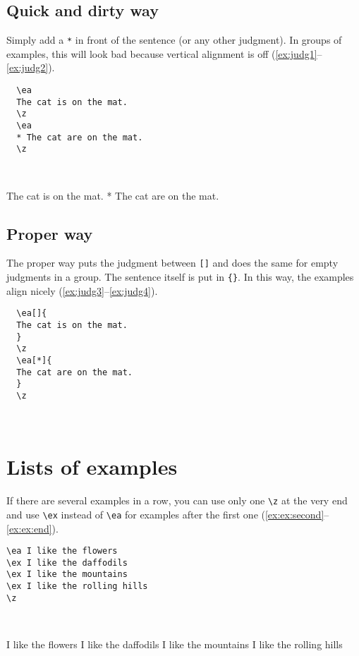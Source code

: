 \documentclass[output=paper]{langscibook}
\newcommand{\cmd}[1]{\texttt{\textbackslash#1}}
\begin{document}
\subsection{Quick and dirty way}  
Simply add a \texttt{*} in front of the sentence (or any other judgment). In groups of examples, this will look bad because vertical alignment is off (\ref{ex:judg1}--\ref{ex:judg2}).

\begin{minipage}[t]{.45\textwidth}
\begin{lstlisting}
  \ea 
  The cat is on the mat.
  \z
  \ea 
  * The cat are on the mat.
  \z
\end{lstlisting}
\end{minipage}~
\parbox[t]{.45\textwidth}{
  \ea\label{ex:judg1} 
  The cat is on the mat.
  \z
  \ea\label{ex:judg2} 
  * The cat are on the mat.
  \z
  }
  
\subsection{Proper way}  
The proper way puts the judgment between \texttt{[]} and does the same for empty judgments in a group. The sentence itself is put in \texttt{\{\}}. In this way, the examples align nicely (\ref{ex:judg3}--\ref{ex:judg4}).
  
\begin{minipage}[t]{.45\textwidth}
\begin{lstlisting}
  \ea[]{ 
  The cat is on the mat.
  }
  \z 
  \ea[*]{ 
  The cat are on the mat.
  }
  \z
\end{lstlisting}
\end{minipage}~
\parbox[t]{.45\textwidth}{
  \z 
  \z
  }
  
 
\section{Lists of examples}
If there are several examples in a row, you can use only one \cmd{z} at the very end and use \cmd{ex} instead of \cmd{ea} for examples after the first one (\ref{ex:ex:second}--\ref{ex:ex:end}).

\begin{minipage}{.45\textwidth}
\begin{lstlisting}
\ea I like the flowers
\ex I like the daffodils
\ex I like the mountains
\ex I like the rolling hills
\z
\end{lstlisting}
\end{minipage}~
\parbox{.45\textwidth}{
\ea I like the flowers\label{ex:ex:start}
\ex I like the daffodils\label{ex:ex:second}
\ex I like the mountains
\ex I like the rolling hills\label{ex:ex:end}
\z
}
\end{document}

